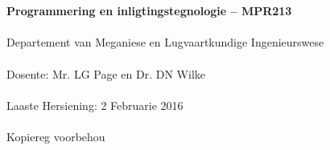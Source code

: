 \begin{titlepage}
    \thispagestyle{empty}
    \\~\\[18cm]
    \large
    \textbf{Programmering en inligtingstegnologie -- MPR213} \\~\\
    Departement van Meganiese en Lugvaartkundige Ingenieurswese \\~\\[0.5cm]
    \normalsize
    Dosente: Mr. LG Page en  Dr. DN Wilke \\~\\
    Laaste Hersiening: 2 Februarie 2016 \\~\\[0.5em]
    \textcopyright \quad Kopiereg voorbehou \\~\\
\end{titlepage}
\restoregeometry
